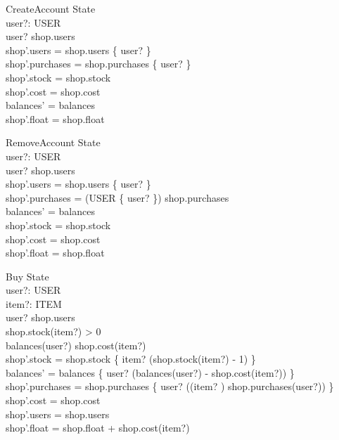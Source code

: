 \documentclass[a4paper]{article}
\begin{document}
\begin{schema}{CreateAccount}
	\Delta State \\
	user?: USER \\
	\where
	user? \notin shop.users \\
	shop'.users = shop.users \cup \{ user? \} \\
	shop'.purchases = shop.purchases \oplus \{ user? \mapsto \emptyset \} \\
	shop'.stock = shop.stock \\
	shop'.cost = shop.cost \\
	balances' = balances \\
	shop'.float = shop.float \\
\end{schema}

\begin{schema}{RemoveAccount}
	\Delta State \\
	user?: USER \\
	\where
	user? \in shop.users \\
	shop'.users = shop.users \setminus  \{ user? \} \\
	shop'.purchases = (USER \setminus \{ user? \}) \dres shop.purchases  \\
	balances' = balances \\
	shop'.stock = shop.stock \\
	shop'.cost = shop.cost \\
	shop'.float = shop.float \\
\end{schema} 

\begin{schema}{Buy}
	\Delta State \\
	user?: USER \\
	item?: ITEM \\
	\where
	user? \in shop.users \\
	shop.stock(item?) > 0 \\
	balances(user?) \geq shop.cost(item?) \\
	shop'.stock = shop.stock \oplus \{ item? \mapsto (shop.stock(item?) - 1) \} \\
	balances' = balances \oplus \{ user? \mapsto (balances(user?) - shop.cost(item?)) \} \\
	shop'.purchases = shop.purchases \oplus \{ user? \mapsto ((\langle item? \rangle) \cat shop.purchases(user?)) \} \\
	shop'.cost = shop.cost \\
	shop'.users = shop.users \\
	shop'.float = shop.float + shop.cost(item?) \\
\end{schema}
\end{document}
